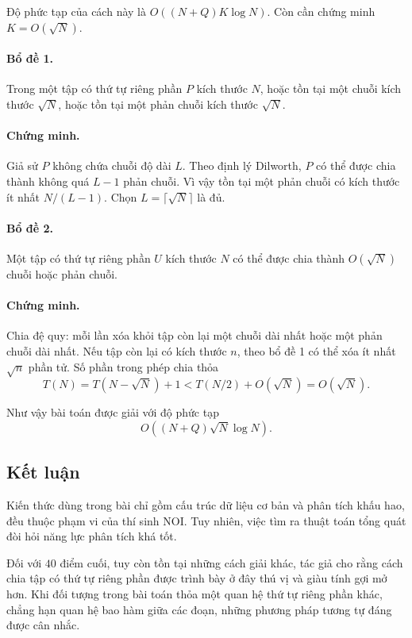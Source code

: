 \documentclass[11pt]{article}
\begin{document}
Độ phức tạp của cách này là \(O((N+Q)K\log N)\). Còn cần chứng minh
\(K=O(\sqrt N)\).

\paragraph{Bổ đề 1.}
Trong một tập có thứ tự riêng phần \(P\) kích thước \(N\), hoặc tồn tại một
chuỗi kích thước \(\sqrt N\), hoặc tồn tại một phản chuỗi kích thước
\(\sqrt N\).

\paragraph{Chứng minh.}
Giả sử \(P\) không chứa chuỗi độ dài \(L\). Theo định lý Dilworth, \(P\) có thể
được chia thành không quá \(L-1\) phản chuỗi. Vì vậy tồn tại một phản chuỗi có
kích thước ít nhất \(N/(L-1)\). Chọn \(L=\lceil\sqrt N\rceil\) là đủ.

\paragraph{Bổ đề 2.}
Một tập có thứ tự riêng phần \(U\) kích thước \(N\) có thể được chia thành
\(O(\sqrt N)\) chuỗi hoặc phản chuỗi.

\paragraph{Chứng minh.}
Chia đệ quy: mỗi lần xóa khỏi tập còn lại một chuỗi dài nhất hoặc một phản
chuỗi dài nhất. Nếu tập còn lại có kích thước \(n\), theo bổ đề 1 có thể xóa
ít nhất \(\sqrt n\) phần tử. Số phần trong phép chia thỏa
\[
  T(N)=T(N-\sqrt N)+1<T(N/2)+O(\sqrt N)=O(\sqrt N).
\]

Như vậy bài toán được giải với độ phức tạp
\[
  O((N+Q)\sqrt N\log N).
\]

\subsection{Kết luận}

Kiến thức dùng trong bài chỉ gồm cấu trúc dữ liệu cơ bản và phân tích khấu hao,
đều thuộc phạm vi của thí sinh NOI. Tuy nhiên, việc tìm ra thuật toán tổng quát
đòi hỏi năng lực phân tích khá tốt.

Đối với \(40\) điểm cuối, tuy còn tồn tại những cách giải khác, tác giả cho rằng
cách chia tập có thứ tự riêng phần được trình bày ở đây thú vị và giàu tính gợi
mở hơn. Khi đối tượng trong bài toán thỏa một quan hệ thứ tự riêng phần khác,
chẳng hạn quan hệ bao hàm giữa các đoạn, những phương pháp tương tự đáng được
cân nhắc.
\end{document}
